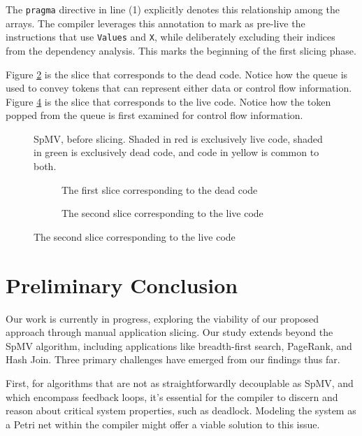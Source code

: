 \documentclass{acaces}
\begin{document}
The \texttt{pragma} directive in line (1) explicitly denotes this relationship among the arrays.
The compiler leverages this annotation to mark as pre-live the instructions that use \texttt{Values} and \texttt{X},
while deliberately excluding their indices from the dependency analysis.
This marks the beginning of the first slicing phase.

Figure \ref{fig:firstSlice} is the slice that corresponds to the dead code.
Notice how the queue is used to convey tokens that can represent either data or control flow information.
Figure \ref{fig:secondSlice} is the slice that corresponds to the live code.
Notice how the token popped from the queue is first examined for control flow information.

\begin{figure}[ht]
  \centering
  
  \caption{SpMV, before slicing. Shaded in red is exclusively live code, shaded in green is exclusively dead code, and code in yellow is common to both. }
  \label{fig:spmv}
\end{figure}

\begin{figure}[ht]
  \centering

  \begin{subfigure}{1.0\textwidth}
    \centering
    
    \caption{The first slice corresponding to the dead code}
    \label{fig:firstSlice}
  \end{subfigure}

  \begin{subfigure}{1.0\textwidth}
    \centering
    
    \caption{The second slice corresponding to the live code}
    \label{fig:secondSlice}
  \end{subfigure}

\end{figure}

\section{Preliminary Conclusion}

Our work is currently in progress, exploring the viability of our proposed approach through manual application slicing.
Our study extends beyond the SpMV algorithm, including applications like breadth-first search, PageRank, and Hash Join.
Three primary challenges have emerged from our findings thus far.

First, for algorithms that are not as straightforwardly decouplable as SpMV, and which encompass feedback loops, it's essential for the compiler to discern and reason about critical system properties, such as deadlock.
Modeling the system as a Petri net within the compiler might offer a viable solution to this issue.
\end{document}
